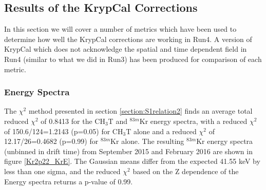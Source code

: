 
\subsection{Results of the KrypCal Corrections} \label{Results}

In this section we will cover a number of metrics which have been used to determine how well the KrypCal corrections are working in Run4.  A version of KrypCal which does not acknowledge the spatial and time dependent field in Run4 (similar to what we did in Run3) has been produced for comparison of each metric.


\subsubsection{Energy Spectra}\label{Result:Spectra}

The $\chi^2$ method presented in section \ref{section:S1relation2} finds an average total reduced $\chi^2$ of 0.8413 for the CH$_3$T and $^{83m}$Kr energy spectra, with a reduced $\chi^2$ of  150.6/124=1.2143 (p=0.05) for CH$_3$T alone and a reduced $\chi^2$ of 12.17/26=0.4682 (p=0.99) for $^{83m}$Kr alone.  The resulting $^{83m}$Kr energy spectra (unbinned in drift time) from September 2015 and February 2016 are shown in figure \ref{Kr2p22_KrE}.  The Gaussian means differ from the expected 41.55 keV by less than one sigma, and the reduced $\chi^2$ based on the Z dependence of the Energy spectra returns a p-value of 0.99.

